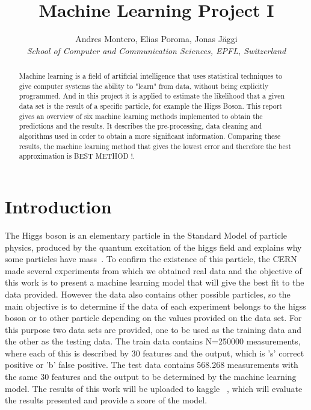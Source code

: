 \documentclass[10pt,conference,compsocconf]{IEEEtran}
\begin{document}
\title{Machine Learning Project I}

\author{
  Andres Montero, Elias Poroma, Jonas J\"aggi\\
  \textit{School of Computer and Communication Sciences, EPFL, Switzerland}
}

\maketitle

\begin{abstract}
  Machine learning is a field of artificial intelligence that uses statistical 
  techniques to give computer systems the ability to "learn" from data, 
  without being explicitly programmed. And in this project it is applied 
  to estimate the likelihood that a given data set is the result of a
  specific particle, for example the Higss Boson.
  This report gives an overview of six machine learning methods implemented
  to obtain the predictions and the results. It describes the pre-processing, 
  data cleaning and algorithms used in order to obtain a more significant 
  information.
  Comparing these results, the machine learning method that gives the 
  lowest error and therefore the best approximation is BEST METHOD !.

\end{abstract}

\section{Introduction}

The Higgs boson is an elementary particle in the Standard Model of 
particle physics, produced by the quantum excitation of the higgs field
and explains why some particles have mass~\cite{wiki01}. To confirm 
the existence of this particle, the CERN made several experiments from 
which we obtained real data and the objective of this work is to present 
a machine learning model that will give the best fit to the data provided.
However the data also contains other possible particles, so the main 
objective is to determine if the data of each experiment belongs to 
the higss boson or to other particle depending on the values provided
on the data set. For this purpose two data sets are provided, one to 
be used as the training data and the other as the testing data. 
The train data contains N=250000 measurements, where each of this
is described by 30 features and the output, which is 's' correct positive
or 'b' false positive. The test data contains 568.268 measurements with
the same 30 features and the output to be determined by the machine
learning model. The results of this work will be uploaded to kaggle ~\cite{kaggle01}, 
which will evaluate the results presented and provide a score of the 
model.
\end{document}
